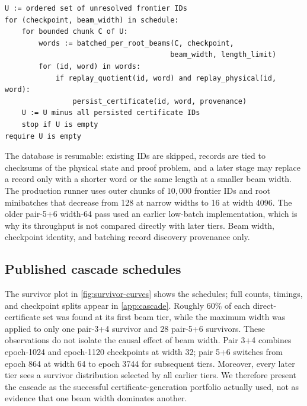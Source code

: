 \begin{lstlisting}[caption={Survivor beam cascade used for certificate discovery.},
                   label={lst:cascade}]
U := ordered set of unresolved frontier IDs
for (checkpoint, beam_width) in schedule:
    for bounded chunk C of U:
        words := batched_per_root_beams(C, checkpoint,
                                       beam_width, length_limit)
        for (id, word) in words:
            if replay_quotient(id, word) and replay_physical(id, word):
                persist_certificate(id, word, provenance)
    U := U minus all persisted certificate IDs
    stop if U is empty
require U is empty
\end{lstlisting}

The database is resumable: existing IDs are skipped, records are tied to
checksums of the physical state and proof problem, and a later stage may replace
a record only with a shorter word or the same length at a smaller beam width.
The production runner uses outer chunks of $10{,}000$ frontier IDs and root
minibatches that decrease from 128 at narrow widths to 16 at width 4096.  The
older pair-5+6 width-64 pass used an earlier low-batch implementation, which is
why its throughput is not compared directly with later tiers.  Beam width,
checkpoint identity, and batching record discovery provenance only.

\subsection{Published cascade schedules}

The survivor plot in \cref{fig:survivor-curves} shows the schedules; full
counts, timings, and checkpoint splits appear in \cref{app:cascade}.  Roughly
60\% of each direct-certificate set was found at its first beam tier, while
the maximum width was applied to only one pair-3+4 survivor and $28$
pair-5+6 survivors.  These observations do not isolate the causal effect of
beam width.  Pair 3+4 combines
epoch-1024 and epoch-1120 checkpoints at width 32; pair 5+6 switches from
epoch 864 at width 64 to epoch 3744 for subsequent tiers.  Moreover, every
later tier sees a survivor distribution selected by all earlier tiers.  We
therefore present the cascade as the successful certificate-generation
portfolio actually used, not as evidence that one beam width dominates
another.
